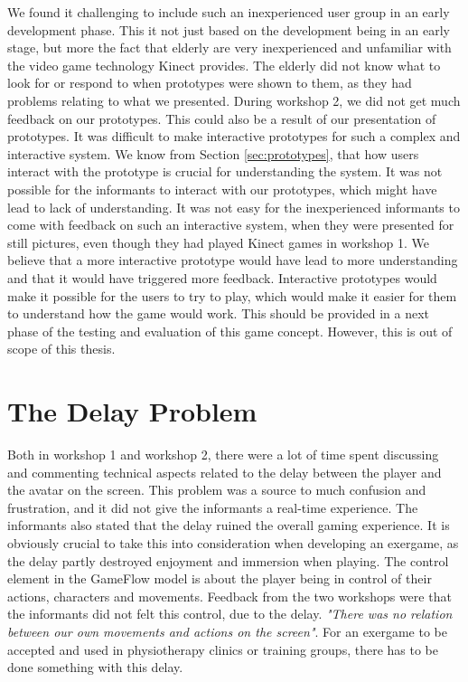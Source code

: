 We found it challenging to include such an inexperienced user group in an early development phase. This it not just based on the development being in an early stage, but more the fact that elderly are very inexperienced and unfamiliar with the video game technology Kinect provides. The elderly did not know what to look for or respond to when prototypes were shown to them, as they had problems relating to what we presented. During workshop 2, we did not get much feedback on our prototypes. This could also be a result of our presentation of prototypes. It was difficult to make interactive prototypes for such a complex and interactive system. We know from Section \ref{sec:prototypes}, that how users interact with the prototype is crucial for understanding the system. It was not possible for the informants to interact with our prototypes, which might have lead to lack of understanding. It was not easy for the inexperienced informants to come with feedback on such an interactive system, when they were presented for still pictures, even though they had played Kinect games in workshop 1. We believe that a more interactive prototype would have lead to more understanding and that it would have triggered more feedback. Interactive prototypes would make it possible for the users to try to play, which would make it easier for them to understand how the game would work. This should be provided in a next phase of the testing and evaluation of this game concept. However, this is out of scope of this thesis. 
 
\section{The Delay Problem}
\label{sec:delay}
Both in workshop 1 and workshop 2, there were a lot of time spent discussing and commenting technical aspects related to the delay between the player and the avatar on the screen. This problem was a source to much confusion and frustration, and it did not give the informants a real-time experience. The informants also stated that the delay ruined the overall gaming experience. It is obviously crucial to take this into consideration when developing an exergame, as the delay partly destroyed enjoyment and immersion when playing. The control element in the GameFlow model \cite{sweetser} is about the player being in control of their actions, characters and movements. Feedback from the two workshops were that the informants did not felt this control, due to the delay. \emph{"There was no relation between our own movements and actions on the screen"}. For an exergame to be accepted and used in physiotherapy clinics or training groups, there has to be done something with this delay. 

